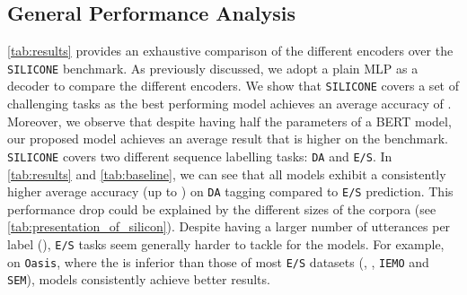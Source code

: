 \documentclass[11pt,a4paper]{article}
\begin{document}
\begin{table*}
\setlength{\tabcolsep}{4pt}
\begin{center}
\caption{Performances of different encoders when decoding using a MLP on \texttt{SILICONE}. The datasets are grouped by label type (\texttt{DA} vs \texttt{E/S}) and ordered by decreasing size.  stands for ,  for  and  for .}
\label{tab:results}
\end{center}
\end{table*}

\subsection{General Performance Analysis}
\autoref{tab:results} provides an exhaustive comparison of the different encoders over the \texttt{SILICONE} benchmark.
As previously discussed, we adopt a plain MLP as a decoder to compare the different encoders.
We show that \texttt{SILICONE} covers a set of challenging tasks as the best performing model achieves an average accuracy of .
Moreover, we observe that despite having half the parameters of a BERT model, our proposed model achieves an average result that is  higher on the benchmark.
\texttt{SILICONE} covers two different sequence labelling tasks: \texttt{DA} and \texttt{E/S}.
In \autoref{tab:results} and \autoref{tab:baseline}, we can see that all models exhibit a consistently higher average accuracy (up to ) on \texttt{DA} tagging compared to \texttt{E/S} prediction. This performance drop could be explained by the different sizes of the corpora (see \autoref{tab:presentation_of_silicon}). 
Despite having a larger number of utterances per label (), \texttt{E/S} tasks seem generally harder to tackle for the models. For example, on \texttt{Oasis}, where the  is inferior than those of most \texttt{E/S} datasets (, , \texttt{IEMO} and \texttt{SEM}), models consistently achieve better results.
\end{document}
